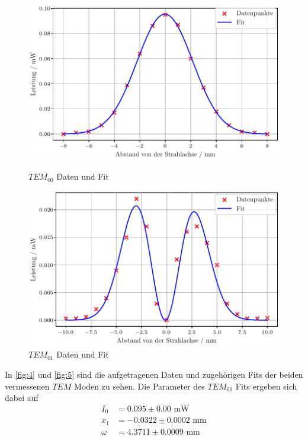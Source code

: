 \begin{figure}[H]
    \centering
    \begin{minipage}{0.48\textwidth}
        \centering
        \includegraphics[width=1\textwidth]{plots/TEM_00.pdf}
        \caption{$TEM_{00}$ Daten und Fit}
        \label{fig:4}
    \end{minipage}\hfill
    \begin{minipage}{0.48\textwidth}
        \centering
        \includegraphics[width=1\textwidth]{plots/TEM_01.pdf}
        \caption{$TEM_{01}$ Daten und Fit}
        \label{fig:5}
    \end{minipage}
\end{figure}
In \autoref{fig:4} und \autoref{fig:5} sind die aufgetragenen Daten und zugehörigen Fits der beiden vermessenen $TEM$ Moden zu sehen. Die Parameter des $TEM_{00}$ Fits ergeben sich dabei auf 
\begin{align}
  I_0 &= 0.095 \pm 0.00 \, \, \mathrm{mW} \\
  x_1 &= -0.0322 \pm 0.0002 \, \, \mathrm{mm} \\
  \omega &= 4.3711 \pm 0.0009 \, \, \mathrm{mm} \\
\end{align}